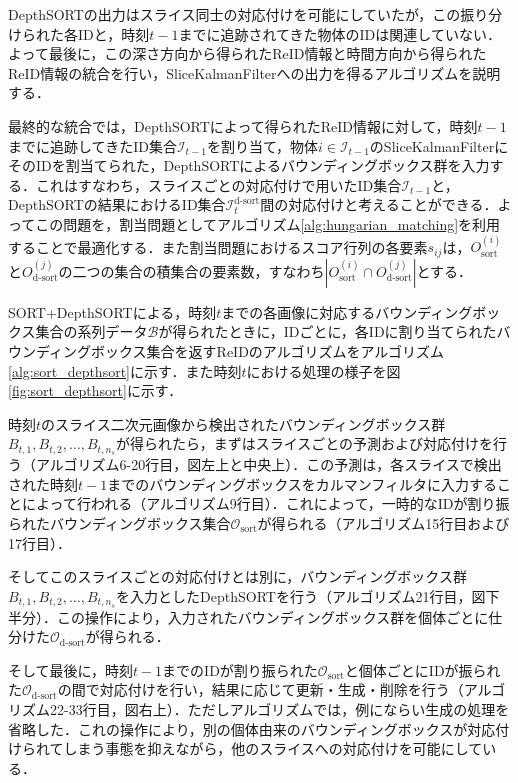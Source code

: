         DepthSORTの出力はスライス同士の対応付けを可能にしていたが，この振り分けられた各IDと，時刻$t-1$までに追跡されてきた物体のIDは関連していない．よって最後に，この深さ方向から得られたReID情報と時間方向から得られたReID情報の統合を行い，SliceKalmanFilterへの出力を得るアルゴリズムを説明する．

        最終的な統合では，DepthSORTによって得られたReID情報に対して，時刻$t-1$までに追跡してきたID集合$\mathcal{I}_{t-1}$を割り当て，物体$i \in \mathcal{I}_{t-1}$のSliceKalmanFilterにそのIDを割当てられた，DepthSORTによるバウンディングボックス群を入力する．これはすなわち，スライスごとの対応付けで用いたID集合$\mathcal{I}_{t-1}$と，DepthSORTの結果におけるID集合$\mathcal{I}_t^{\text{d-sort}}$間の対応付けと考えることができる．よってこの問題を，割当問題としてアルゴリズム\ref{alg:hungarian_matching}を利用することで最適化する．また割当問題におけるスコア行列の各要素$s_{ij}$は，$O_{\text{sort}}^{(i)}$と$O_{\text{d-sort}}^{(j)}$の二つの集合の積集合の要素数，すなわち$\left| O_{\text{sort}}^{(i)}\cap O_{\text{d-sort}}^{(j)}\right|$とする．

        SORT+DepthSORTによる，時刻$t$までの各画像に対応するバウンディングボックス集合の系列データ$\mathcal{B}$が得られたときに，IDごとに，各IDに割り当てられたバウンディングボックス集合を返すReIDのアルゴリズムをアルゴリズム\ref{alg:sort_depthsort}に示す．また時刻$t$における処理の様子を図\ref{fig:sort_depthsort}に示す．

        時刻$t$のスライス二次元画像から検出されたバウンディングボックス群$B_{t, 1}, B_{t, 2}, \dots, B_{t, n_s}$が得られたら，まずはスライスごとの予測および対応付けを行う（アルゴリズム6-20行目，図左上と中央上）．この予測は，各スライスで検出された時刻$t-1$までのバウンディングボックスをカルマンフィルタに入力することによって行われる（アルゴリズム9行目）．これによって，一時的なIDが割り振られたバウンディングボックス集合$\mathcal{O}_{\text{sort}}$が得られる（アルゴリズム15行目および17行目）．

        そしてこのスライスごとの対応付けとは別に，バウンディングボックス群$B_{t, 1}, B_{t, 2}, \dots, B_{t, n_s}$を入力としたDepthSORTを行う（アルゴリズム21行目，図下半分）．この操作により，入力されたバウンディングボックス群を個体ごとに仕分けた$\mathcal{O}_{\text{d-sort}}$が得られる．

        そして最後に，時刻$t-1$までのIDが割り振られた$\mathcal{O}_{\text{sort}}$と個体ごとにIDが振られた$\mathcal{O}_{\text{d-sort}}$の間で対応付けを行い，結果に応じて更新・生成・削除を行う（アルゴリズム22-33行目，図右上）．ただしアルゴリズムでは，例にならい生成の処理を省略した．これの操作により，別の個体由来のバウンディングボックスが対応付けられてしまう事態を抑えながら，他のスライスへの対応付けを可能にしている．

